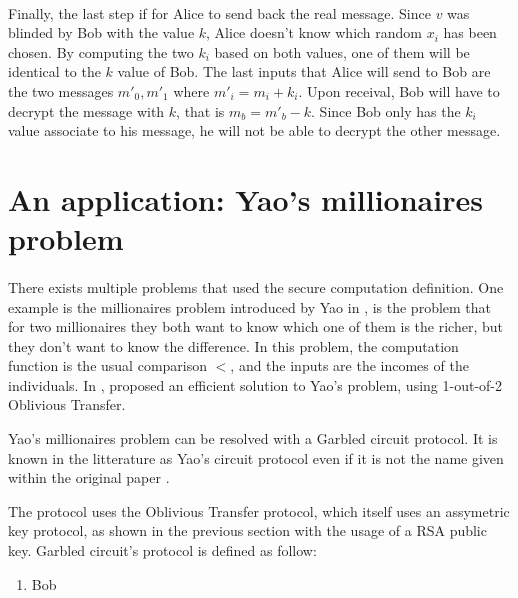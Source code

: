 \documentclass[11pt,a4paper]{article}
\begin{document}
\paragraph{}

Finally, the last step if for Alice to send back the real message.
Since $v$ was blinded by Bob
with the value $k$, Alice doesn't know which random $x_i$ has been chosen.
By computing the two $k_i$ based on both values, one of them
will be identical to the $k$ value of Bob. The last inputs that
Alice will send to Bob are the two messages $m'_0, m'_1$ where
$m'_i = m_i + k_i$. Upon receival, Bob will have to decrypt
the message with $k$, that is $m_b = m'_b - k$. Since Bob
only has the $k_i$ value associate to his message, he will not be
able to decrypt the other message.



\section{An application: Yao's millionaires problem}

\paragraph{}

There exists multiple problems that used the secure computation definition.
One example is the millionaires problem introduced by Yao in
\cite{yao_protocols_1982}, is the problem that for two millionaires
they both want to know which one of them is the richer, but they
don't want to know the difference. In this problem, the computation
function is the usual comparison $<$, and the inputs are the incomes of
the individuals. In \cite{hutchison_efficient_2005},
proposed an efficient solution to Yao's problem, using 1-out-of-2
Oblivious Transfer.

Yao's millionaires problem can be resolved with a Garbled circuit
protocol. It is known in the litterature as Yao's circuit protocol
even if it is not the name given within the original
paper \cite{yao_protocols_1982}.

The protocol uses the Oblivious Transfer protocol, which
itself uses an assymetric key protocol, as shown in the previous
section with the usage of a RSA public key.
Garbled circuit's protocol is defined as follow:
\begin{enumerate}
    \item Bob
\end{enumerate}
\end{document}
